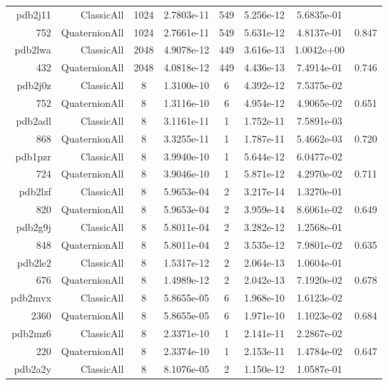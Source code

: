 \begin{xltabular}{\textwidth}{r|rcS[table-format=1.4e+2]cS[table-format=1.3e+2]S[table-format=1.4e+2]S[table-format=-1.3]}
{\color{red} pdb2j11 } & ClassicAll & 1024 & 2.7803e-11 & 549 & 5.256e-12 & 5.6835e-01 & \\
752 & QuaternionAll & 1024 & 2.7661e-11 & 549 & 5.631e-12 & 4.8137e-01 & 0.847\\  \addlinespace
{\color{red} pdb2lwa } & ClassicAll & 2048 & 4.9078e-12 & 449 & 3.616e-13 & 1.0042e+00 & \\
432 & QuaternionAll & 2048 & 4.0818e-12 & 449 & 4.436e-13 & 7.4914e-01 & 0.746\\  \addlinespace
pdb2j0z & ClassicAll & 8 & 1.3100e-10 & 6 & 4.392e-12 & 7.5375e-02 & \\
752 & QuaternionAll & 8 & 1.3116e-10 & 6 & 4.954e-12 & 4.9065e-02 & 0.651\\  \addlinespace
pdb2adl & ClassicAll & 8 & 3.1161e-11 & 1 & 1.752e-11 & 7.5891e-03 & \\
868 & QuaternionAll & 8 & 3.3255e-11 & 1 & 1.787e-11 & 5.4662e-03 & 0.720\\  \addlinespace
pdb1pzr & ClassicAll & 8 & 3.9940e-10 & 1 & 5.644e-12 & 6.0477e-02 & \\
724 & QuaternionAll & 8 & 3.9046e-10 & 1 & 5.871e-12 & 4.2970e-02 & 0.711\\  \addlinespace
pdb2lzf & ClassicAll & 8 & 5.9653e-04 & 2 & 3.217e-14 & 1.3270e-01 & \\
820 & QuaternionAll & 8 & 5.9653e-04 & 2 & 3.959e-14 & 8.6061e-02 & 0.649\\  \addlinespace
pdb2g9j & ClassicAll & 8 & 5.8011e-04 & 2 & 3.282e-12 & 1.2568e-01 & \\
848 & QuaternionAll & 8 & 5.8011e-04 & 2 & 3.535e-12 & 7.9801e-02 & 0.635\\  \addlinespace
pdb2le2 & ClassicAll & 8 & 1.5317e-12 & 2 & 2.064e-13 & 1.0604e-01 & \\
676 & QuaternionAll & 8 & 1.4989e-12 & 2 & 2.042e-13 & 7.1920e-02 & 0.678\\  \addlinespace
pdb2mvx & ClassicAll & 8 & 5.8655e-05 & 6 & 1.968e-10 & 1.6123e-02 & \\
2360 & QuaternionAll & 8 & 5.8655e-05 & 6 & 1.971e-10 & 1.1023e-02 & 0.684\\  \addlinespace
pdb2mz6 & ClassicAll & 8 & 2.3371e-10 & 1 & 2.141e-11 & 2.2867e-02 & \\
220 & QuaternionAll & 8 & 2.3374e-10 & 1 & 2.153e-11 & 1.4784e-02 & 0.647\\  \addlinespace
pdb2a2y & ClassicAll & 8 & 8.1076e-05 & 2 & 1.150e-12 & 1.0587e-01 & \\

\end{xltabular}
